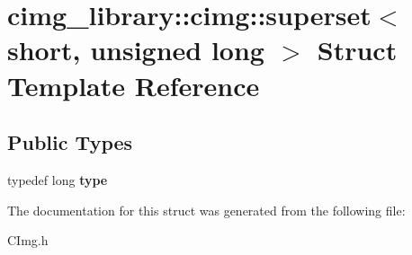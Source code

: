\hypertarget{structcimg__library_1_1cimg_1_1superset_3_01short_00_01unsigned_01long_01_4}{\section{cimg\-\_\-library\-:\-:cimg\-:\-:superset$<$ short, unsigned long $>$ Struct Template Reference}
\label{structcimg__library_1_1cimg_1_1superset_3_01short_00_01unsigned_01long_01_4}
}
\subsection*{Public Types}
\begin{DoxyCompactItemize}
\item 
\hypertarget{structcimg__library_1_1cimg_1_1superset_3_01short_00_01unsigned_01long_01_4_a84377921ba151f90513661cea194f561}{typedef long {\bfseries type}}\label{structcimg__library_1_1cimg_1_1superset_3_01short_00_01unsigned_01long_01_4_a84377921ba151f90513661cea194f561}

\end{DoxyCompactItemize}


The documentation for this struct was generated from the following file\-:\begin{DoxyCompactItemize}
\item 
C\-Img.\-h\end{DoxyCompactItemize}
